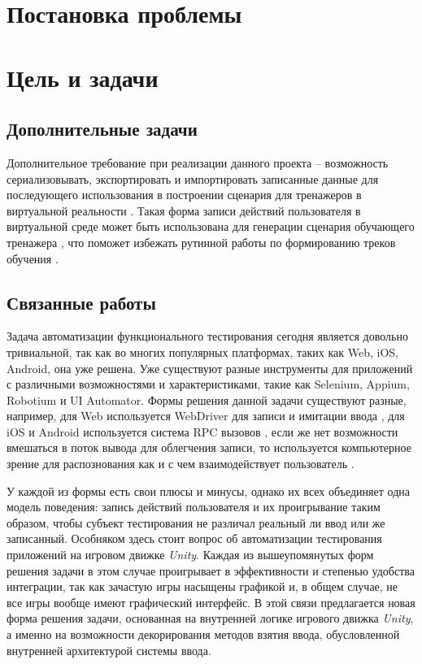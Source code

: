\Introduction

\section{Постановка проблемы}

\section{Цель и задачи}

\subsection{Дополнительные задачи}
Дополнительное требование при реализации данного проекта -- возможность сериализовывать, экспортировать и импортировать записанные данные для последующего использования в построении сценария для тренажеров в виртуальной реальности \cite{disser}. Такая форма записи действий пользователя в виртуальной среде может быть использована для генерации сценария обучающего тренажера \cite{vr-simulators}, что поможет избежать рутинной работы по формированию треков обучения \cite{visual-editor}.

\subsection{Связанные работы}
Задача автоматизации функционального тестирования сегодня является довольно тривиальной, так как во многих популярных платформах, таких как Web, iOS, Android, она уже решена. Уже существуют разные инструменты для приложений с различными возможностями и характеристиками, такие как Selenium, Appium, Robotium и UI Automator. Формы решения данной задачи существуют разные, например, для Web используется WebDriver для записи и имитации ввода \cite{selenium}, для iOS и Android используется система RPC вызовов \cite{rpc_testing}, если же нет возможности вмешаться в поток вывода для облегчения записи, то используется компьютерное зрение для распознования как и с чем взаимодействует пользователь \cite{appium_opencv}. 

У каждой из формы есть свои плюсы и минусы, однако их всех объединяет одна модель поведения: запись действий пользователя и их проигрывание таким образом, чтобы субъект тестирования не различал реальный ли ввод или же записанный. Особняком здесь стоит вопрос об автоматизации тестирования приложений на игровом движке \textit{Unity}. Каждая из вышеупомянутых форм решения задачи в этом случае проигрывает в эффективности и степенью удобства интеграции, так как зачастую игры насыщены графикой и, в общем случае, не все игры вообще имеют графический интерфейс. В этой связи предлагается новая форма решения задачи, основанная на внутренней логике игрового движка \textit{Unity}, а именно на возможности декорирования методов взятия ввода, обусловленной внутренней архитектурой системы ввода.

